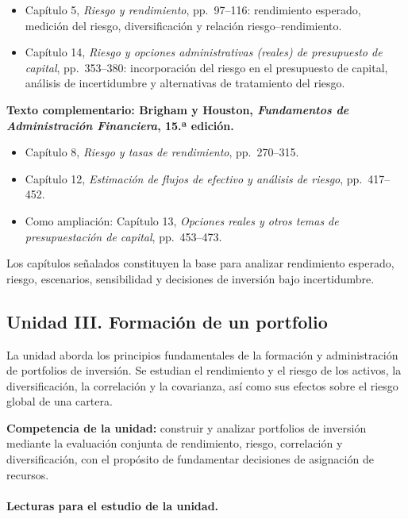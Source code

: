 \documentclass[12pt,a4paper]{article}
\begin{document}
\begin{itemize}
    \item Capítulo 5, \textit{Riesgo y rendimiento},
    pp.~97--116: rendimiento esperado, medición del riesgo,
    diversificación y relación riesgo--rendimiento.

    \item Capítulo 14, \textit{Riesgo y opciones administrativas
    (reales) de presupuesto de capital}, pp.~353--380:
    incorporación del riesgo en el presupuesto de capital,
    análisis de incertidumbre y alternativas de tratamiento del riesgo.
\end{itemize}

\noindent
\textbf{Texto complementario: Brigham y Houston,
\textit{Fundamentos de Administración Financiera}, 15.ª edición.}

\begin{itemize}
    \item Capítulo 8, \textit{Riesgo y tasas de rendimiento},
    pp.~270--315.
    \item Capítulo 12, \textit{Estimación de flujos de efectivo y análisis
    de riesgo}, pp.~417--452.
    \item Como ampliación: Capítulo 13,
    \textit{Opciones reales y otros temas de presupuestación de capital},
    pp.~453--473.
\end{itemize}

\noindent
Los capítulos señalados constituyen la base para analizar rendimiento
esperado, riesgo, escenarios, sensibilidad y decisiones de inversión
bajo incertidumbre.
\parencite{vanhorne2010fundamentos,brigham2020fundamentos}

\subsection{Unidad III. Formación de un portfolio}

La unidad aborda los principios fundamentales de la formación y
administración de portfolios de inversión. Se estudian el rendimiento y
el riesgo de los activos, la diversificación, la correlación y la
covarianza, así como sus efectos sobre el riesgo global de una cartera.
\parencite{uaProgramaFinanzasLargoPlazo}

\textbf{Competencia de la unidad:} construir y analizar portfolios de
inversión mediante la evaluación conjunta de rendimiento, riesgo,
correlación y diversificación, con el propósito de fundamentar decisiones
de asignación de recursos.

\paragraph{Lecturas para el estudio de la unidad.}
\end{document}
